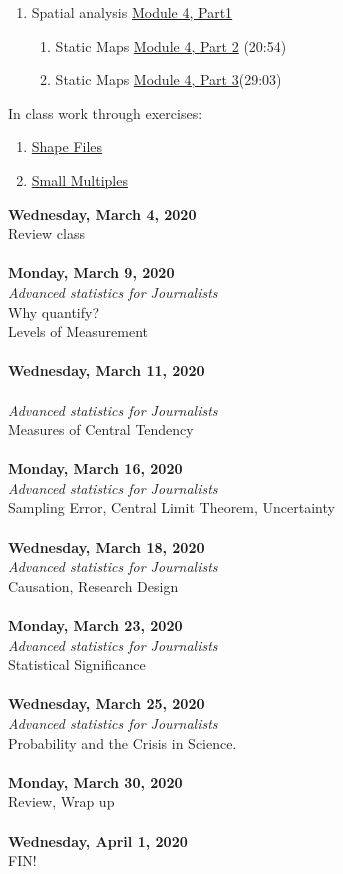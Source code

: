 \documentclass{article}
\begin{document}
\begin{enumerate}
\item Spatial analysis \href{https://youtu.be/iF050DaUxC4}{Module 4, Part1}
\begin{enumerate}
\item Static Maps \href{https://youtu.be/-udJxD9DkA8}{Module 4, Part 2} (20:54)
\item Static Maps \href{https://youtu.be/fyt7UqYEESs}{Module 4, Part 3}(29:03)
\end{enumerate}

\end{enumerate}
\bigskip 
In class work through exercises: 
\begin{enumerate}
\item \href{http://code.r-journalism.com/chapter-5/#section-shape-files}{Shape Files}
\item \href{http://code.r-journalism.com/chapter-5/#section-small-multiples}{Small Multiples}
\end{enumerate}
\bigskip
\textbf{Wednesday, March 4, 2020\\}
Review class\\\\
\textbf{Monday, March 9, 2020\\}
\emph{Advanced statistics for Journalists}\\
Why quantify?\\
Levels of Measurement\\\\
\textbf{Wednesday, March 11, 2020\\}\\
\emph{Advanced statistics for Journalists}\\
Measures of Central Tendency\\\\
\textbf{Monday, March 16, 2020\\}
\emph{Advanced statistics for Journalists}\\
Sampling Error, Central Limit Theorem, Uncertainty\\\\
\textbf{Wednesday, March 18, 2020\\}
\emph{Advanced statistics for Journalists}\\
Causation, Research Design\\\\
\textbf{Monday, March 23, 2020\\}
\emph{Advanced statistics for Journalists}\\
Statistical Significance\\\\
\textbf{Wednesday, March 25, 2020\\}
\emph{Advanced statistics for Journalists}\\
Probability and the Crisis in Science. \\\\
\textbf{Monday, March 30, 2020\\}
Review, Wrap up\\\\
\textbf{Wednesday, April 1, 2020\\}
FIN!\\
\end{document}
